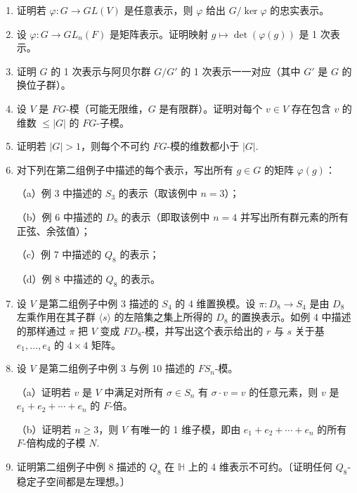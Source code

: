 \begin{enumerate}
\item 证明若 \(\varphi : G \to GL(V)\) 是任意表示，则 \(\varphi\) 给出 \(G/\ker\varphi\) 的忠实表示。

\item 设 \(\varphi : G \to GL_n(F)\) 是矩阵表示。证明映射 \(g \mapsto \det(\varphi(g))\) 是 1 次表示。

\item 证明 \(G\) 的 1 次表示与阿贝尔群 \(G/G'\) 的 1 次表示一一对应（其中 \(G'\) 是 \(G\) 的换位子群）。

\item 设 \(V\) 是 \(FG\)-模（可能无限维，\(G\) 是有限群）。证明对每个 \(v \in V\) 存在包含 \(v\) 的维数 \(\leq |G|\) 的 \(FG\)-子模。

\item 证明若 \(|G| > 1\)，则每个不可约 \(FG\)-模的维数都小于 \(|G|\).

\item 对下列在第二组例子中描述的每个表示，写出所有 \(g \in G\) 的矩阵 \(\varphi(g)\)：

（a）例 3 中描述的 \(S_3\) 的表示（取该例中 \(n = 3\)）；

（b）例 6 中描述的 \(D_8\) 的表示（即取该例中 \(n = 4\) 并写出所有群元素的所有正弦、余弦值）；

（c）例 7 中描述的 \(Q_8\) 的表示；

（d）例 8 中描述的 \(Q_8\) 的表示。

\item 设 \(V\) 是第二组例子中例 3 描述的 \(S_4\) 的 4 维置换模。设 \(\pi : D_8 \to S_4\) 是由 \(D_8\) 左乘作用在其子群 \(\langle s\rangle\) 的左陪集之集上所得的 \(D_8\) 的置换表示。如例 4 中描述的那样通过 \(\pi\) 把 \(V\) 变成 \(FD_8\)-模，并写出这个表示给出的 \(r\) 与 \(s\) 关于基 \(e_1, \ldots, e_4\) 的 \(4 \times 4\) 矩阵。

\item 设 \(V\) 是第二组例子中例 3 与例 10 描述的 \(FS_n\)-模。

（a）证明若 \(v\) 是 \(V\) 中满足对所有 \(\sigma \in S_n\) 有 \(\sigma \cdot v = v\) 的任意元素，则 \(v\) 是 \(e_1+e_2+\cdots+e_n\) 的 \(F\)-倍。

（b）证明若 \(n \geq 3\)，则 \(V\) 有唯一的 1 维子模，即由 \(e_1+e_2+\cdots+e_n\) 的所有 \(F\)-倍构成的子模 \(N\).

\item 证明第二组例子中例 8 描述的 \(Q_8\) 在 \(\mathbb{H}\) 上的 4 维表示不可约。〔证明任何 \(Q_8\)-稳定子空间都是左理想。〕


\end{enumerate}
